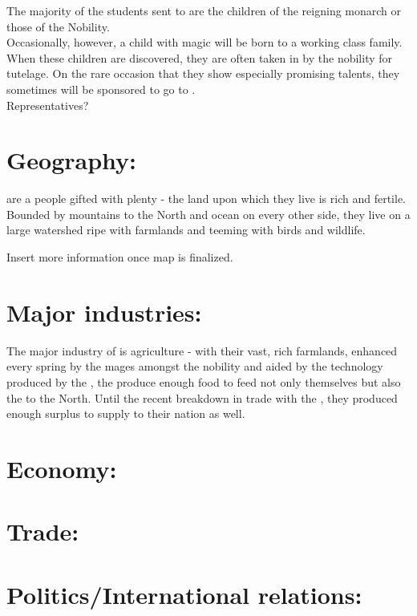 \documentclass[blue]{GL2020}
\begin{document}
The majority of the students sent to \pSchool{} are the children of the reigning monarch or those of the Nobility.\\

Occasionally, however, a child with magic will be born to a working class family.  When these children are discovered, they are often taken in by the nobility for tutelage.  On the rare occasion that they show especially promising talents, they sometimes will be sponsored to go to \pSchool{}.\\

Representatives?

\section{Geography:}

\pSunCh{} are a people gifted with plenty - the land upon which they live is rich and fertile.  Bounded by mountains to the North and ocean on every other side, they live on a large watershed ripe with farmlands and teeming with birds and wildlife.  

Insert more information once map is finalized.

\section{Major industries:}

The major industry of \pSun{} is agriculture - with their vast, rich farmlands, enhanced every spring by the mages amongst the nobility and aided by the technology produced by the \pArtisans{}, the \pSunCh{} produce enough food to feed not only themselves but also the \pMage{} to the North.  Until the recent breakdown in trade with the \pViking{}, they produced enough surplus to supply to their nation as well.  

\section{Economy:}

\section{Trade:}

\section{Politics/International relations:}
\end{document}
